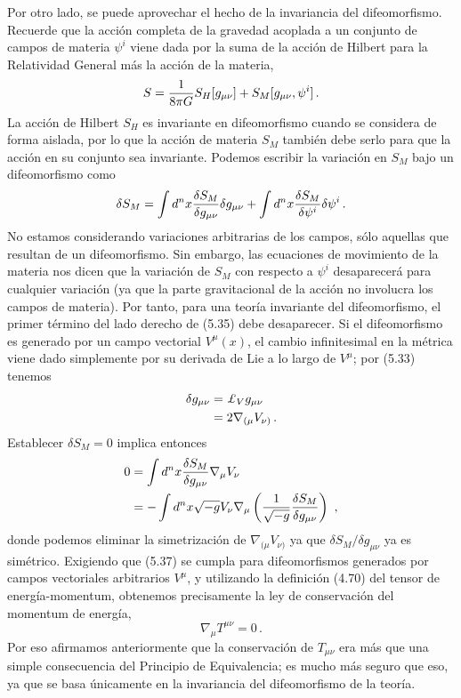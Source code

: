 \documentclass[11pt,b5paper,openany,twoside]{book}
\newcommand{\mn}{{\mu\nu}}
\def\g{{\sqrt{-g}}}
\def\lie{\pounds}
\begin{document}
Por otro lado, se puede aprovechar el hecho de la invariancia del difeomorfismo.
Recuerde que la acción completa de la gravedad acoplada a un conjunto de campos de materia $\psi^i$ viene dada por la suma de la acción de Hilbert para la Relatividad General más la acción de la materia,
\begin{equation}
S={1\over{8\pi G}}S_H[g_\mn]+S_M[g_\mn,\psi^i]\,.\label{5.34}
\end{equation}
La acción de Hilbert $S_H$ es invariante en difeomorfismo cuando se considera de forma aislada, por lo que la acción de materia $S_M$ también debe serlo para que la acción en su conjunto sea invariante.
Podemos escribir la variación en $S_M$ bajo un difeomorfismo como
\begin{equation}
\delta S_M=\int d^nx {{\delta S_M}\over{\delta g_\mn}}\delta g_\mn
+ \int d^nx {{\delta S_M}\over{\delta \psi^i}}\delta \psi^i\,.
\label{5.35}
\end{equation}
No estamos considerando variaciones arbitrarias de los campos, sólo aquellas que resultan de un difeomorfismo.
Sin embargo, las ecuaciones de movimiento de la materia nos dicen que la variación de $S_M$ con respecto a $\psi^i$ desaparecerá para cualquier variación (ya que la parte gravitacional de la acción no involucra los campos de materia).
Por tanto, para una teoría invariante del difeomorfismo, el primer término del lado derecho de (5.35) debe desaparecer.
Si el difeomorfismo es generado por un campo vectorial $V^\mu(x)$, el cambio infinitesimal en la métrica viene dado simplemente por su derivada de Lie a lo largo de $V^\mu$; por (5.33) tenemos
\begin{align}
\delta g_\mn  &=  \lie_V g_\mn \notag \\
&=  2\nabla_{(\mu} V_{\nu)}\,.\label{5.36}
\end{align}
Establecer $\delta S_M=0$ implica entonces
\begin{align}
0  &=  \int d^nx {{\delta S_M}\over{\delta g_\mn}}
\nabla_{\mu} V_{\nu}  \notag \\
&=  -\int d^nx\g V_\nu\nabla_\mu\left({1\over{\g}}{{\delta S_M}\over
{\delta g_\mn}}\right)\ ,\label{5.37}
\end{align}
donde podemos eliminar la simetrización de $\nabla_{(\mu} V_{\nu)}$ ya que $\delta S_M/\delta g_\mn$ ya es simétrico.
Exigiendo que (5.37) se cumpla para difeomorfismos generados por campos vectoriales arbitrarios $V^\mu$, y utilizando la definición (4.70) del tensor de energía-momentum, obtenemos precisamente la ley de conservación del momentum de energía,
\begin{equation}
\nabla_\mu T^\mn=0\,.\label{5.38}
\end{equation}
Por eso afirmamos anteriormente que la conservación de $T_\mn$ era más que una simple consecuencia del Principio de Equivalencia; es mucho más seguro que eso, ya que se basa únicamente en la invariancia del difeomorfismo de la teoría.
\end{document}
